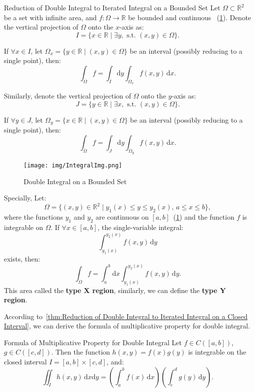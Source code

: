 \documentclass[11pt]{../../TexTemplate/elegantbook}
\begin{document}
\begin{theorem}{Reduction of Double Integral to Iterated Integral on a Bounded Set}
    Let \( \Omega \subset \mathbb{R}^2 \) be a set with infinite area, 
    and \( f: \Omega \to \mathbb{R} \) be bounded and continuous
    ~(\ref{fig:Double Integral on a Bounded Set}). 
    Denote the vertical projection of \( \Omega \) onto the \( x \)-axis as:
    \[
    I = \{ x \in \mathbb{R} \mid \exists y, \text{ s.t. } (x, y) \in \Omega \}.
    \]

    If \( \forall x \in I \), let \( \Omega_x = \{ y \in \mathbb{R} \mid (x, y) \in \Omega \} \) 
    be an interval (possibly reducing to a single point), then:
    \[
    \int_\Omega f = \int_I \mathrm{d}y \int_{\Omega_x} f(x, y) \, \mathrm{d}x.
    \]

    Similarly, denote the vertical projection of \( \Omega \) onto the \( y \)-axis as:
    \[
    J = \{ y \in \mathbb{R} \mid \exists x, \text{ s.t. } (x, y) \in \Omega \}.
    \]

    If \( \forall y \in J \), let \( \Omega_y = \{ x \in \mathbb{R} \mid (x, y) \in \Omega \} \) be an interval (possibly reducing to a single point), then:
    \[
    \int_\Omega f = \int_J \mathrm{d}y \int_{\Omega_y} f(x, y) \, \mathrm{d}x.
    \]
\end{theorem}
\begin{figure}[h]
    \centering
    \texttt{[image: img/IntegralImg.png]}
    \caption{Double Integral on a Bounded Set}
    \label{fig:Double Integral on a Bounded Set}
\end{figure}

Specially, Let:
\[
\Omega = \{ (x, y) \in \mathbb{R}^2 \mid y_1(x) \leqslant y \leqslant y_2(x), \, a \leqslant x \leqslant b \},
\]
where the functions \( y_1 \) and \( y_2 \) are continuous on \( [a, b] \)~(\ref{fig:Double Integral on a Bounded Set}) 
and the function \( f \) is integrable on \( \Omega \). If \( \forall x \in [a, b] \), the single-variable integral:
\[
\int_{y_1(x)}^{y_2(x)} f(x, y) \, \mathrm{d}y
\]
exists, then:
\[
\int_\Omega f = \int_a^b \mathrm{d}x \int_{y_1(x)}^{y_2(x)} f(x, y) \, \mathrm{d}y.
\]
This area called the \textbf{type X region}, similarly, we can define the \textbf{type Y region}.


According to~\ref{thm:Reduction of Double Integral to Iterated Integral on a Closed Interval},
we can derive the formula of multiplicative property for double integral.

\begin{theorem}{Formula of Multiplicative Property for Double Integral}
    Let \( f \in C([a, b]) \), \( g \in C([c, d]) \). 
    Then the function \( h(x, y) = f(x) g(y) \) is integrable on the closed interval \( I = [a, b] \times [c, d] \), 
    and:
    \[
    \iint_I h(x, y) \, \mathrm{d}x \mathrm{d}y = \left( \int_a^b f(x) \, \mathrm{d}x \right) 
    \left( \int_c^d g(y) \, \mathrm{d}y \right).
    \]
\end{theorem}
\end{document}
